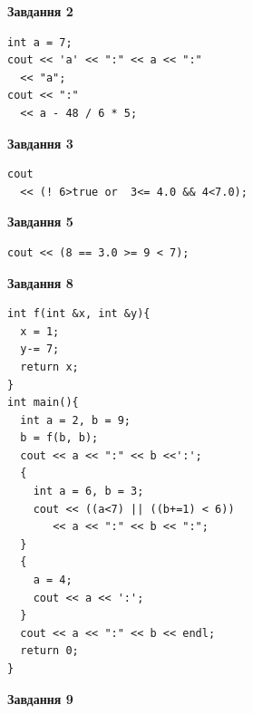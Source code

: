 \documentclass[12pt, ukrainian]{article}
\begin{document}
{\begin {large}
\begin{minipage}[t]{7.0cm}
\end{minipage}
\vline \hspace{1mm}
\begin{minipage}[t]{11.0cm}

\begin{center}
\textbf{Завдання 2}
\end{center}
\vspace{-8mm}

\begin{verbatim}
int a = 7;
cout << 'a' << ":" << a << ":" 
  << "a";
cout << ":" 
  << a - 48 / 6 * 5;
\end{verbatim}



\begin{center}
\textbf{Завдання 3}
\end{center}
\vspace{-8mm}

\begin{verbatim}
cout 
  << (! 6>true or  3<= 4.0 && 4<7.0);
\end{verbatim}



\begin{center}
\textbf{Завдання 5}
\end{center}
\vspace{-8mm}

\begin{verbatim}
cout << (8 == 3.0 >= 9 < 7);
\end{verbatim}



\begin{center}
\textbf{Завдання 8}
\end{center}
\vspace{-8mm}

\begin{verbatim}
int f(int &x, int &y){
  x = 1;
  y-= 7;
  return x;
}
int main(){
  int a = 2, b = 9;
  b = f(b, b);
  cout << a << ":" << b <<':';
  {
    int a = 6, b = 3;
    cout << ((a<7) || ((b+=1) < 6))
       << a << ":" << b << ":";
  }
  {
    a = 4;
    cout << a << ':';
  }
  cout << a << ":" << b << endl;
  return 0;
}
\end{verbatim}

\end{minipage}


\begin{minipage}[t]{7.0cm}

\begin{center}
\textbf{Завдання 9}
\end{center}
\vspace{-8mm}


\end{minipage}
\end{large}}
\end{document}
